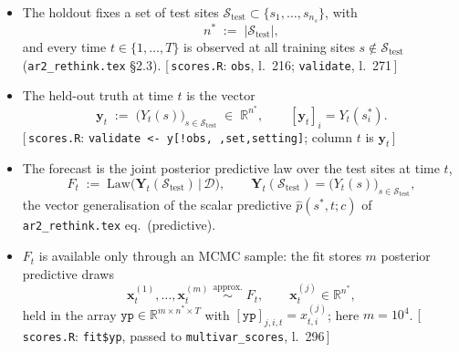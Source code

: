 \documentclass[11pt]{article}
\newcommand{\R}{\mathbb{R}}
\newcommand{\D}{\mathcal{D}}
\newcommand{\given}{\,\vert\,}
\newcommand{\impl}[1]{{\footnotesize\textsf{\textcolor{blue!45!black}{[\,#1\,]}}}}
\begin{document}
\begin{itemize}[leftmargin=1.5em, itemsep=3pt]
  \item The holdout fixes a set of test sites
        $\mathcal S_{\mathrm{test}}\subset\{s_1,\dots,s_{n_s}\}$, with
        \begin{equation}
          n^\ast \;:=\; |\mathcal S_{\mathrm{test}}|,
        \end{equation}
        and every time $t\in\{1,\dots,T\}$ is observed at all training
        sites $s\notin\mathcal S_{\mathrm{test}}$
        (\texttt{ar2\_rethink.tex} \S2.3).
        \impl{\texttt{scores.R}: \texttt{obs}, l.~216; \texttt{validate}, l.~271}
  \item The held-out truth at time $t$ is the vector
        \begin{equation}
          \bm y_t \;:=\; \big(Y_t(s)\big)_{s\in\mathcal S_{\mathrm{test}}}
                  \;\in\;\R^{n^\ast},
          \qquad [\bm y_t]_i = Y_t(s_i^\ast).
          \label{eq:ytruth}
        \end{equation}
        \impl{\texttt{scores.R}: \texttt{validate <- y[!obs,\,,set,setting]}; column $t$ is $\bm y_t$}
  \item The forecast is the joint posterior predictive law over the test
        sites at time $t$,
        \begin{equation}
          F_t \;:=\; \mathrm{Law}\!\big(\bm Y_t(\mathcal S_{\mathrm{test}})
                     \given \D\big),
          \qquad
          \bm Y_t(\mathcal S_{\mathrm{test}})
            = \big(Y_t(s)\big)_{s\in\mathcal S_{\mathrm{test}}},
          \label{eq:predlaw}
        \end{equation}
        the vector generalisation of the scalar predictive
        $\hat p(s^\ast,t;c)$ of \texttt{ar2\_rethink.tex} eq.~(predictive).
  \item $F_t$ is available only through an MCMC sample: the fit stores
        $m$ posterior predictive draws
        \begin{equation}
          \bm x_t^{(1)},\dots,\bm x_t^{(m)}
            \;\overset{\text{approx.}}{\sim}\; F_t,
          \qquad
          \bm x_t^{(j)}\in\R^{n^\ast},
          \label{eq:sample}
        \end{equation}
        held in the array $\texttt{yp}\in\R^{m\times n^\ast\times T}$ with
        $[\texttt{yp}]_{j,i,t}=x_{t,i}^{(j)}$; here $m=10^4$.
        \impl{\texttt{scores.R}: \texttt{fit\$yp}, passed to \texttt{multivar\_scores}, l.~296}
\end{itemize}
\end{document}
